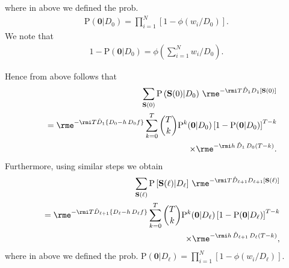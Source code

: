 \documentclass[10pt]{iopart}
\newcommand{\1}{\mathbf{1}}
\newcommand{\Prob}{\mathrm{P}}
\newcommand{\Sm}{\ensuremath{\mathbf{S}}}
\begin{document}
%
where in above we defined the prob.
%
\begin{eqnarray}
\Prob(\mathbf{0}\vert D_0)=\prod_{i=1}^N\left[1-\phi(w_i/D_0)\right]. 
\end{eqnarray}
%
We note that 
\begin{eqnarray}
1-\Prob(\mathbf{0}\vert D_0)=\phi\left(\sum_{i=1}^Nw_i/D_0\right). 
\end{eqnarray}
%


Hence from above follows that 
%
\begin{eqnarray}
&&\sum_{\Sm(0)}\Prob\left(\Sm(0)\vert D_0\right)\,\rme^{-\rmi T\hat{D}_{1} D_{1}[\Sm(0)]}\nonumber\\
&&~=\rme^{-\rmi T\hat{D}_{1} \left\{D_{0}-h\,D_{0}f \right\}}\sum_{k=0}^T{T\choose k}\Prob^k(\mathbf{0}\vert D_0)\left[1-\Prob(\mathbf{0}\vert D_0)\right]^{T-k}\nonumber\\
&&~~~~~~~~~~~~\times\rme^{-\rmi h\,\hat{D}_{1} \,D_{0} (T-k)}.
%
\end{eqnarray}
%
Furthermore, using similar steps we obtain 
%
\begin{eqnarray}
&&\sum_{\Sm(\ell)}\Prob\left[\Sm(\ell)\vert D_\ell\right]\,\rme^{-\rmi T\hat{D}_{\ell+1} D_{\ell+1}[\Sm(\ell)]}\nonumber\\
&&~=\rme^{-\rmi T\hat{D}_{\ell+1} \left\{D_{\ell}-h\,D_{\ell}f \right\}}\sum_{k=0}^T{T\choose k}\Prob^k(\mathbf{0}\vert D_\ell)\left[1-\Prob(\mathbf{0}\vert D_\ell)\right]^{T-k}\nonumber\\
&&~~~~~~~~~~~~\times\rme^{-\rmi h\,\hat{D}_{\ell+1} \,D_{\ell} (T-k)},
%
\end{eqnarray}
%
where in above we defined the prob. 
$\Prob(\mathbf{0}\vert D_\ell)=\prod_{i=1}^N\left[1-\phi(w_i/D_\ell)\right]$.
\end{document}
